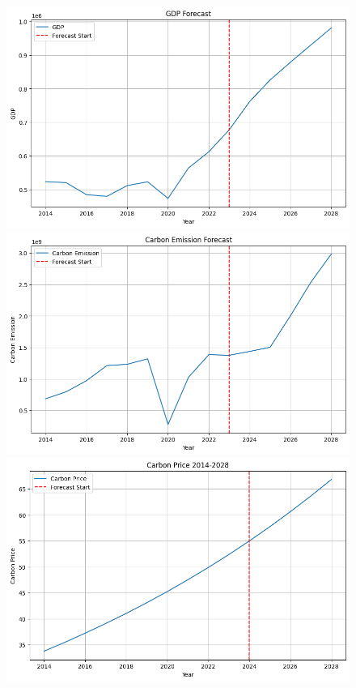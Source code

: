 \begin{figure}[H]
    \centering
    \begin{minipage}[t]{0.32\textwidth}
        \centering
        \includegraphics[width=1\textwidth]{GDP_Sitka.png}
    \end{minipage}
    \hfill
    \begin{minipage}[t]{0.32\textwidth}
        \centering
        \includegraphics[width=1\textwidth]{C_Emission_Sitka.png}
    \end{minipage}
    \hfill
    \begin{minipage}[t]{0.32\textwidth}
        \centering
        \includegraphics[width=1\textwidth]{C_Price_Sitka.png}
    \end{minipage}
\end{figure}


